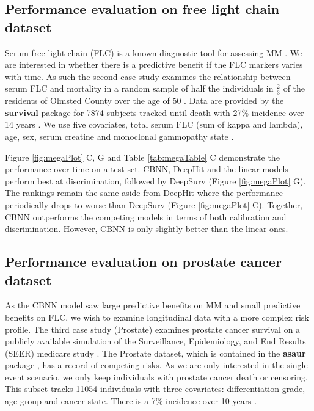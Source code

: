 \documentclass[preprint,12pt,authoryear]{elsarticle}
\begin{document}

\hypertarget{pe-flc}{%
\subsection{Performance evaluation on free light chain dataset}\label{pe-flc}}
Serum free light chain (FLC) is a known diagnostic tool for assessing MM \citep{mm2flc}. We are interested in whether there is a predictive benefit if the FLC markers
varies with time. As such the second case study examines the relationship between serum FLC and mortality in a random sample of half the individuals in
$\frac{2}{3}$ of the residents of Olmsted County over the age of 50 \citep{flc}. Data are provided by the \textbf{survival} package \citep{survpkg} for 7874 subjects tracked
until death with 27\% incidence over 14 years \citep{flc}. We use five covariates, total serum FLC (sum of kappa and lambda), age, sex, serum creatine and monoclonal gammopathy state \citep{flc}.

Figure \ref{fig:megaPlot} C, G and Table \ref{tab:megaTable} C demonstrate the performance over time on a test set. CBNN, DeepHit and the linear models perform best at
discrimination, followed by DeepSurv (Figure \ref{fig:megaPlot} G). The rankings remain the same aside from DeepHit where the performance periodically drops to worse
than DeepSurv (Figure \ref{fig:megaPlot} C). Together, CBNN outperforms the competing models in terms of both calibration and discrimination.
However, CBNN is only slightly better than the linear ones.

\hypertarget{pe-prostate}{%
\subsection{Performance evaluation on prostate cancer dataset}\label{pe-prostate}}
As the CBNN model saw large predictive benefits on MM and small predictive benefits on FLC, we wish to examine longitudinal data with a more complex risk profile.
The third case study (Prostate) examines prostate cancer survival on a publicly available simulation of the Surveillance, Epidemiology, and End Results (SEER) medicare study \citep{prostate}.
The Prostate dataset, which is contained in the \textbf{asaur} package \citep{asaur}, has a record of competing risks. As we are only interested in the single event scenario,
we only keep individuals with prostate cancer death or censoring. This subset tracks 11054 individuals with three covariates: differentiation grade, age group and cancer
state. There is a 7\% incidence over 10 years \citep{prostate}.
\end{document}

